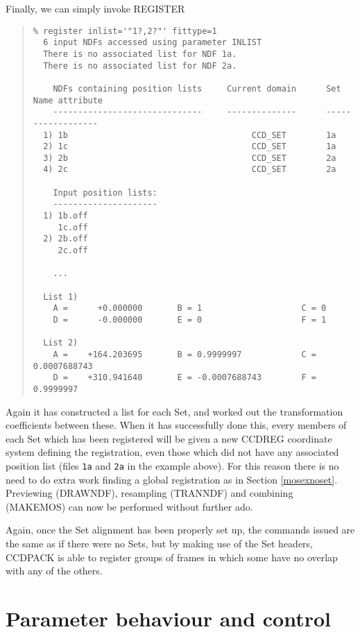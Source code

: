 \documentclass[twoside,11pt]{article}
\newcommand{\htmlref}[2]{#1}
\newcommand{\latexhtml}[2]{#1}
\renewcommand{\_}{\texttt{\symbol{95}}}
\newcommand{\ttsize}{\latexhtml{\small}{}}
\newenvironment{myquote}{\begin{quote}\ttsize}{\end{quote}}
\newcommand{\text}[1]{{\ttsize \tt #1}}
\newcommand{\xroutine}[1]{\htmlref{{\sc #1}}{#1}}
\begin{document}
Finally, we can simply invoke \xroutine{REGISTER}
\begin{myquote}
\begin{verbatim}
% register inlist='"1?,2?"' fittype=1
  6 input NDFs accessed using parameter INLIST
  There is no associated list for NDF 1a.
  There is no associated list for NDF 2a.

    NDFs containing position lists     Current domain      Set Name attribute
    ------------------------------     --------------      ------------------
  1) 1b                                     CCD_SET        1a
  2) 1c                                     CCD_SET        1a
  3) 2b                                     CCD_SET        2a
  4) 2c                                     CCD_SET        2a

    Input position lists:
    ---------------------
  1) 1b.off
     1c.off
  2) 2b.off
     2c.off

    ...

  List 1)
    A =      +0.000000       B = 1                    C = 0
    D =      -0.000000       E = 0                    F = 1

  List 2)
    A =    +164.203695       B = 0.9999997            C = 0.0007688743
    D =    +310.941640       E = -0.0007688743        F = 0.9999997
\end{verbatim}
\end{myquote}
Again it has constructed a list for each Set, and worked out the
transformation coefficients between these.
When it has successfully done this, every members of each Set
which has been registered will be given a new CCD\_REG coordinate
system defining the registration, even those which did not 
have any associated position list (files \text{1a} and \text{2a} in the
example above).
For this reason there is no need to do extra work finding a 
global registration as in Section \ref{mosexnoset}.
Previewing (\xroutine{DRAWNDF}), resampling (\xroutine{TRANNDF}) and
combining (\xroutine{MAKEMOS}) can now be performed without further ado.

Again, once the Set alignment has been properly set up,
the commands issued are the same as if there were no Sets,
but by making use of the Set headers, CCDPACK is able to register
groups of frames in which some have no overlap with any of the others.

\section{Parameter behaviour and control}
\end{document}
